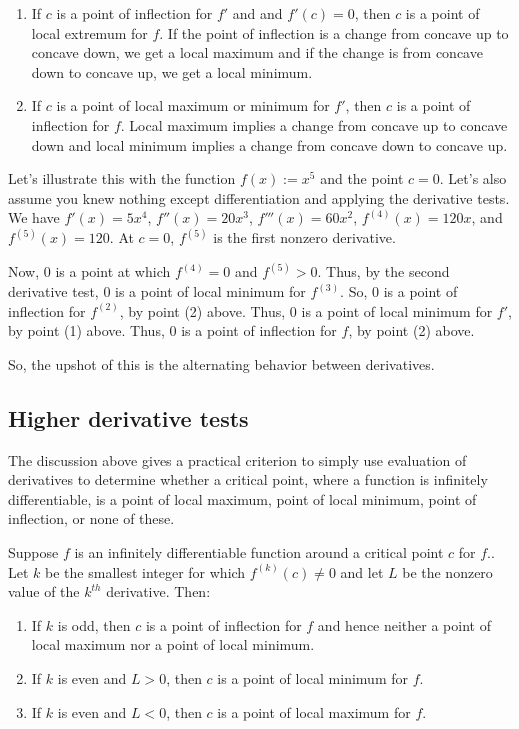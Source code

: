\documentclass[10pt]{amsart}
\begin{document}
\begin{enumerate}
\item If $c$ is a point of inflection for $f'$ and and $f'(c) = 0$,
  then $c$ is a point of local extremum for $f$. If the point of
  inflection is a change from concave up to concave down, we get a
  local maximum and if the change is from concave down to concave up,
  we get a local minimum.
\item If $c$ is a point of local maximum or minimum for $f'$, then $c$
  is a point of inflection for $f$. Local maximum implies a change
  from concave up to concave down and local minimum implies a change
  from concave down to concave up.
\end{enumerate}

Let's illustrate this with the function $f(x) := x^5$ and the point $c
= 0$. Let's also assume you knew nothing except differentiation and
applying the derivative tests. We have $f'(x) = 5x^4$, $f''(x) =
20x^3$, $f'''(x) = 60x^2$, $f^{(4)}(x) = 120x$, and $f^{(5)}(x) =
120$. At $c = 0$, $f^{(5)}$ is the first nonzero derivative.

Now, $0$ is a point at which $f^{(4)} = 0$ and $f^{(5)} > 0$. Thus, by
the second derivative test, $0$ is a point of local minimum for
$f^{(3)}$. So, $0$ is a point of inflection for $f^{(2)}$, by point
(2) above. Thus, $0$ is a point of local minimum for $f'$, by point
(1) above. Thus, $0$ is a point of inflection for $f$, by point (2) above.

So, the upshot of this is the alternating behavior between
derivatives.

\subsection{Higher derivative tests}

The discussion above gives a practical criterion to simply use
evaluation of derivatives to determine whether a critical point, where
a function is infinitely differentiable, is a point of local maximum,
point of local minimum, point of inflection, or none of these.

Suppose $f$ is an infinitely differentiable function around a critical
point $c$ for $f$.. Let $k$ be the smallest integer for which
$f^{(k)}(c) \ne 0$ and let $L$ be the nonzero value of the $k^{th}$
derivative. Then:

\begin{enumerate}
\item If $k$ is odd, then $c$ is a point of inflection for $f$ and
  hence neither a point of local maximum nor a point of local minimum.
\item If $k$ is even and $L > 0$, then $c$ is a point of local minimum
  for $f$.
\item If $k$ is even and $L < 0$, then $c$ is a point of local maximum
  for $f$.
\end{enumerate}
\end{document}
